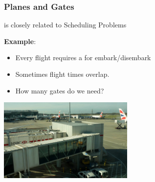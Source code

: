 \documentclass{beamer}
\begin{document}
\begin{frame}
  \frametitle{Planes and Gates}

  {\larger
     is closely related to
    \alert{Scheduling Problems} 

    \bigskip

    {\bf Example}:
    \begin{itemize}
    \item Every flight requires a  for embark/disembark
    \item Sometimes flight times overlap.
    \item How many gates do we need?
    \end{itemize}
  }

  \hfill \includegraphics[width=0.5\textwidth]{../img/airgate}
  
\end{frame}
\end{document}
